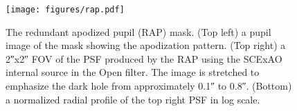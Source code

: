 \begin{figure}
    \centering
    \texttt{[image: figures/rap.pdf]}
    \caption{The redundant apodized pupil (RAP) mask. (Top left) a pupil image of the mask showing the apodization pattern. (Top right) a \ang{;;2}x\ang{;;2} FOV of the PSF produced by the RAP using the SCExAO internal source in the Open filter. The image is stretched to emphasize the dark hole from approximately \ang{;;0.1} to \ang{;;0.8}. (Bottom) a normalized radial profile of the top right PSF in log scale.\label{fig:rap}}
\end{figure}